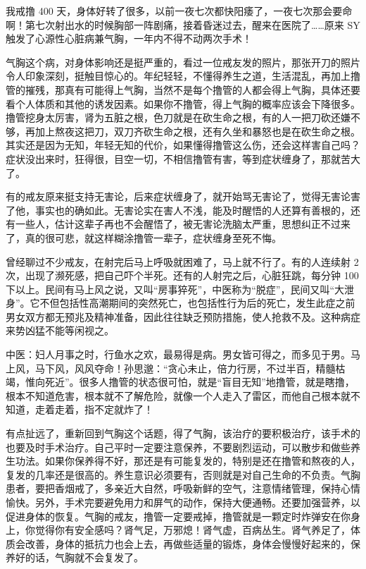 \begin{case}[气胸]
    我戒撸 400 天，身体好转了很多，以前一夜七次都快阳痿了，一夜七次那会要命啊！第七次射出水的时候胸部一阵剧痛，接着昏迷过去，醒来在医院了……原来 SY 触发了心源性心脏病兼气胸，一年内不得不动两次手术！
\end{case}

气胸这个病，对身体影响还是挺严重的，看过一位戒友发的照片，那张开刀的照片令人印象深刻，挺触目惊心的。年纪轻轻，不懂得养生之道，生活混乱，再加上撸管的摧残，那真有可能得上气胸，当然不是每个撸管的人都会得上气胸，具体还要看个人体质和其他的诱发因素。如果你不撸管，得上气胸的概率应该会下降很多。撸管挖身太厉害，肾为五脏之根，色刀就是在砍生命之根，有的人一把刀砍还嫌不够，再加上熬夜这把刀，双刀齐砍生命之根，还有久坐和暴怒也是在砍生命之根。其实还是因为无知，年轻无知的代价，如果懂得撸管这么伤，还会这样害自己吗？症状没出来时，狂得很，目空一切，不相信撸管有害，等到症状缠身了，那就苦大了。

有的戒友原来挺支持无害论，后来症状缠身了，就开始骂无害论了，觉得无害论害了他，事实也的确如此。无害论实在害人不浅，能及时醒悟的人还算有善根的，还有一些人，估计这辈子再也不会醒悟了，被无害论洗脑太严重，思想纠正不过来了，真的很可悲，就这样糊涂撸管一辈子，症状缠身至死不悔。

曾经聊过不少戒友，在射完后马上呼吸就困难了，马上就不行了。有的人连续射 2 次，出现了濒死感，把自己吓个半死。还有的人射完之后，心脏狂跳，每分钟 100 下以上。民间有马上风之说，又叫“房事猝死”，中医称为“脱症”，民间又叫“大泄身”。它不但包括性高潮期间的突然死亡，也包括性行为后的死亡，发生此症之前男女双方都无预兆及精神准备，因此往往缺乏预防措施，使人抢救不及。这种病症来势凶猛不能等闲视之。

中医：妇人月事之时，行鱼水之欢，最易得是病。男女皆可得之，而多见于男。马上风，马下风，风风夺命！孙思邈：“贪心未止，倍力行房，不过半百，精髓枯竭，惟向死近”。很多人撸管的状态很可怕，就是“盲目无知”地撸管，就是瞎撸，根本不知道危害，根本就不了解危险，就像一个人走入了雷区，而他自己根本就不知道，走着走着，指不定就炸了！

有点扯远了，重新回到气胸这个话题，得了气胸，该治疗的要积极治疗，该手术的也要及时手术治疗。自己平时一定要注意保养，不要剧烈运动，可以散步和做些养生功法。如果你保养得不好，那还是有可能复发的，特别是还在撸管和熬夜的人，复发的几率还是很高的。养生意识必须要有，否则就是对自己生命的不负责。气胸患者，要把香烟戒了，多亲近大自然，呼吸新鲜的空气，注意情绪管理，保持心情愉快。另外，手术完要避免用力和屏气的动作，保持大便通畅。还要加强营养，以促进身体的恢复。气胸的戒友，撸管一定要戒掉，撸管就是一颗定时炸弹安在你身上，你觉得你有安全感吗？肾气足，万邪熄！肾气虚，百病丛生。肾气养足了，体质会改善，身体的抵抗力也会上去，再做些适量的锻炼，身体会慢慢好起来的，保养好的话，气胸就不会复发了。

